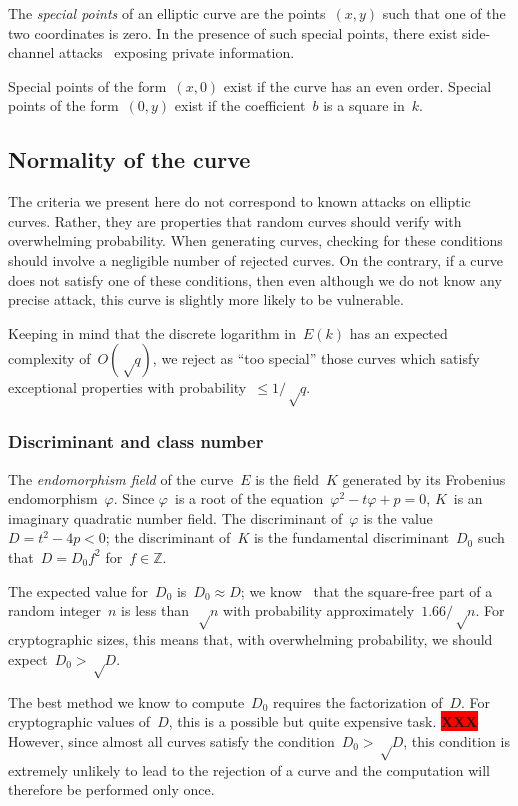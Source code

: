 \documentclass{article}
\def\XXX{{\colorbox{red}{{\color{white}\bfseries XXX}}}}
\begin{document}
The \emph{special points} of an elliptic curve
are the points~$(x,y)$ such that one of the two coordinates is zero.
In the presence of such special points,
there exist side-channel attacks~\cite{pkc2003goubin}
exposing private information.

Special points of the form~$(x, 0)$ exist if the curve has
an even order.
Special points of the form~$(0, y)$ exist if the coefficient~$b$
is a square in~$k$.

\subsection{Normality of the curve}

The criteria we present here do not correspond to
known attacks on elliptic curves.
Rather, they are properties that random curves should verify
with overwhelming probability.
When generating curves, checking for these conditions
should involve a negligible number of rejected curves.
On the contrary, if a curve does not satisfy one of these conditions,
then even although we do not know any precise attack,
this curve is slightly more likely to be vulnerable.

Keeping in mind that the discrete logarithm in~$E(k)$
has an expected complexity of~$O(√q)$,
we reject as ``too special'' those curves
which satisfy exceptional properties with probability~$≤ 1/√q$.

\subsubsection{Discriminant and class number}

The \emph{endomorphism field} of the curve~$E$
is the field~$K$ generated by its Frobenius endomorphism~$φ$.
Since $φ$~is a root of the equation~$φ^2 - t φ + p = 0$,
$K$~is an imaginary quadratic number field.
The discriminant of~$φ$ is the value~$D = t^2 - 4 p < 0$;
the discriminant of~$K$ is the fundamental discriminant~$D_0$
such that~$D = D_0 f^2$ for~$f ∈ ℤ$.

The expected value for~$D_0$ is~$D_0 ≈ D$;
we know~\cite{jis2014cdkd} that the square-free part of
a random integer~$n$ is less than~$√n$
with probability approximately~$1.66/√n$.
For cryptographic sizes, this means that,
with overwhelming probability, we should expect~$D_0 > √D$.

The best method we know to compute~$D_0$ requires the
factorization of~$D$.
For cryptographic values of~$D$, this is a possible but
quite expensive task. \XXX
However, since almost all curves satisfy the condition~$D_0 > √D$,
this condition is extremely unlikely to lead to the rejection of a curve
and the computation will therefore be performed only once.
\end{document}
